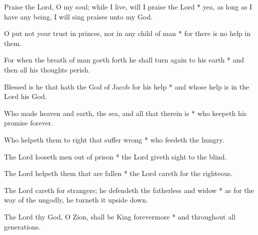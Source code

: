 \begin{multicols}{2}
	
	Praise the Lord, O my soul; while I live, will I praise the Lord * yea, as long as I have any being, I will sing praises unto my God.
	
	O put not your trust in princes, nor in any child of man * for there is no help in them.
	
	For when the breath of man goeth forth he shall turn again to his earth * and then all his thoughts perish.
	
	Blessed is he that hath the God of Jacob for his help * and whose help is in the Lord his God.
	
	Who made heaven and earth, the sea, and all that therein is * who keepeth his promise forever.
	
	Who helpeth them to right that suffer wrong * who feedeth the hungry.
	
	The Lord looseth men out of prison * the Lord giveth sight to the blind.
	
	The Lord helpeth them that are fallen * the Lord careth for the righteous.
	
	The Lord careth for strangers; he defendeth the fatherless and widow * as for the way of the ungodly, he turneth it upside down.
	
	The Lord thy God, O Zion, shall be King forevermore * and throughout all generations.
	
	\gloria{}
\end{multicols}